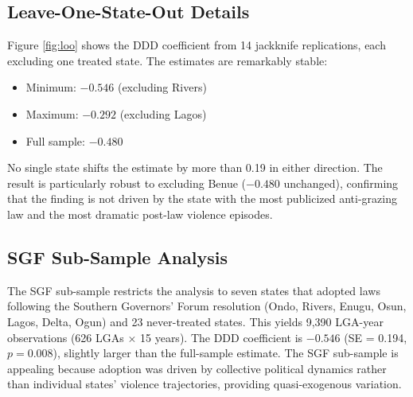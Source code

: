 \documentclass[12pt]{article}
\begin{document}
\subsection{Leave-One-State-Out Details}

Figure \ref{fig:loo} shows the DDD coefficient from 14 jackknife replications, each excluding one treated state. The estimates are remarkably stable:
\begin{itemize}
\item Minimum: $-0.546$ (excluding Rivers)
\item Maximum: $-0.292$ (excluding Lagos)
\item Full sample: $-0.480$
\end{itemize}

No single state shifts the estimate by more than 0.19 in either direction. The result is particularly robust to excluding Benue ($-0.480$ unchanged), confirming that the finding is not driven by the state with the most publicized anti-grazing law and the most dramatic post-law violence episodes.

\subsection{SGF Sub-Sample Analysis}

The SGF sub-sample restricts the analysis to seven states that adopted laws following the Southern Governors' Forum resolution (Ondo, Rivers, Enugu, Osun, Lagos, Delta, Ogun) and 23 never-treated states. This yields 9,390 LGA-year observations (626 LGAs $\times$ 15 years). The DDD coefficient is $-0.546$ (SE = 0.194, $p = 0.008$), slightly larger than the full-sample estimate. The SGF sub-sample is appealing because adoption was driven by collective political dynamics rather than individual states' violence trajectories, providing quasi-exogenous variation.
\end{document}
